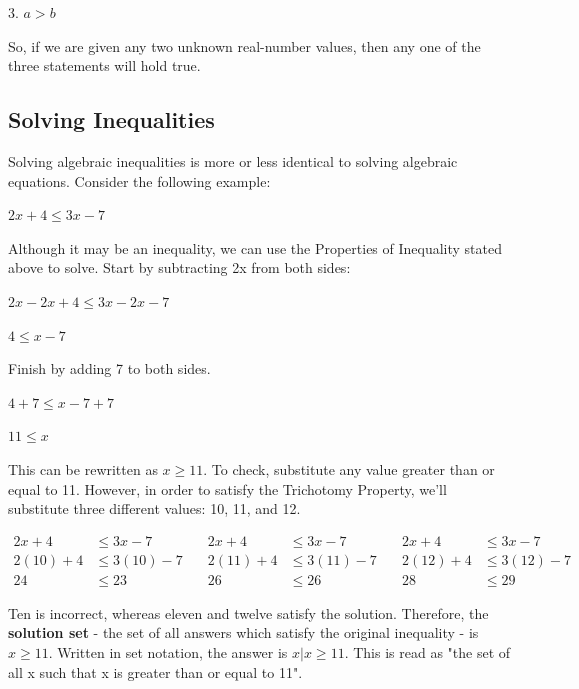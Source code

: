 3.  $a > b$



So, if we are given any two unknown real-number values, then any one of the three
statements will hold true.




\subsection{Solving Inequalities}
\label{sss:solv-f3f9}




Solving algebraic inequalities is more or less identical to solving algebraic equations.
Consider the following example:



$2x + 4 \le 3x - 7$



Although it may be an inequality, we can use the Properties of Inequality stated above to
solve. Start by subtracting 2x from both sides:



$2x - 2x + 4 \le 3x - 2x - 7$



$4 \le x - 7$



Finish by adding 7 to both sides.



$4 + 7 \le x - 7 + 7$



$11 \le x$



This can be rewritten as $x \ge 11$. To check, substitute any value greater than or equal
to 11. However, in order to satisfy the Trichotomy Property, we'll substitute three
different values: 10, 11, and 12.


\[
\begin{aligned}
2x + 4 &\le 3x - 7 \quad & 2x + 4 &\le 3x - 7 \quad & 2x + 4 &\le 3x - 7 \\
2(10) + 4 &\le 3(10) - 7 \quad & 2(11) + 4 &\le 3(11) - 7 \quad & 2(12) + 4 &\le 3(12) - 7 \\
24 &\le 23 \quad & 26 &\le 26 \quad & 28 &\le 29
\end{aligned}
\]

Ten is incorrect, whereas eleven and twelve satisfy the solution. Therefore, the
\textbf{solution set} - the set of all answers which satisfy the original inequality - is
$x \ge 11$. Written in set notation, the answer is {$x | x \ge 11$}. This is read as "the
set of all x such that x is greater than or equal to 11".




